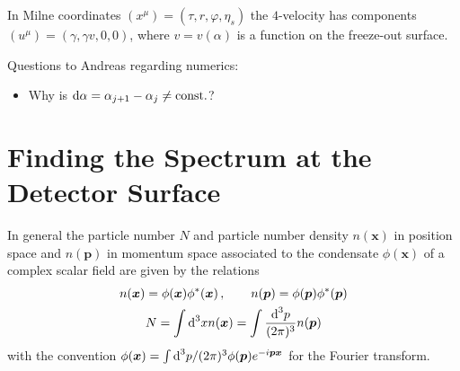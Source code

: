 In Milne coordinates $(x^\mu)=(\tau,r,\varphi,\eta_s)$ the $4$-velocity has components $(u^\mu)=(\gamma,\gamma v,0,0)$, where $v=v(\alpha)$ is a function on the freeze-out surface.

Questions to Andreas regarding numerics:
\begin{itemize}
    \item Why is $\text{d}\alpha=\alpha_{j+1}-\alpha_{j}\neq{\text{const.}}$?
\end{itemize}

\section{Finding the Spectrum at the Detector Surface}

In general the particle number $N$ and particle number density $n(\mathbf{x})$ in position space and $n(\mathbf{p})$ in momentum space associated to the condensate $\phi(\mathbf{x})$ of a complex scalar field are given by the relations
\begin{subequations}
    \begin{gather}
        n({\boldsymbol{x}})=\phi({\boldsymbol{x}})\phi^*({\boldsymbol{x}})\,,\qquad n({\boldsymbol{p}})=\phi({\boldsymbol{p}})\phi^*({\boldsymbol{p}})\\
        N=\int\text{d}^3xn({\boldsymbol{x}})=\int\frac{\text{d}^3p}{(2\pi)^3}n({\boldsymbol{p}})
    \end{gather}
\end{subequations}
with the convention $\phi({\boldsymbol{x}})=\int\text{d}^3p/(2\pi)^3\phi({\boldsymbol{p}})e^{-{i}{\boldsymbol{p}}{\boldsymbol{x}}}$ for the Fourier transform.





